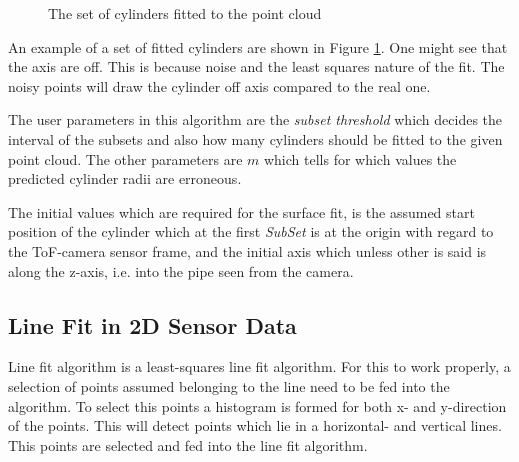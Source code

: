 \begin{figure}[htbp]
    \centering
    \caption{The set of cylinders fitted to the point cloud}
    \label{chap5:fig-cylinderfit}
\end{figure}
An example of a set of fitted cylinders are shown in Figure \ref{chap5:fig-cylinderfit}.
One might see that the axis are off. This is because noise and the least squares nature of
the fit. The noisy points will draw the cylinder off axis compared to the real one. 

The user parameters in this algorithm are the \emph{subset threshold} which decides the interval
of the subsets and also how many cylinders should be fitted to the given point cloud. The
other parameters are $m$ which tells for which values the predicted cylinder radii are
erroneous. 

The initial values which are required for the surface fit, is the assumed start position
of the cylinder which at the first \emph{SubSet} is at the origin with regard to the
ToF-camera sensor frame, and the initial axis which unless other is said is along the
z-axis, i.e. into the pipe seen from the camera.


\subsection{Line Fit in 2D Sensor Data}
Line fit algorithm is a least-squares line fit algorithm. For this to work properly, a
selection of points assumed belonging to the line need to be fed into the algorithm. To
select this points a histogram is formed for both x- and y-direction of the points. This
will detect points which lie in a horizontal- and vertical lines. This points are selected
and fed into the line fit algorithm. 

